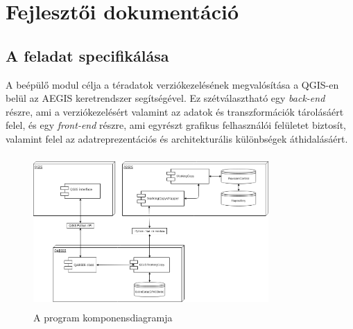 \chapter{Fejlesztői dokumentáció}
\label{ch:impl}

\section{A feladat specifikálása}
A beépülő modul célja a téradatok verziókezelésének megvalósítása a QGIS-en belül az AEGIS keretrendszer segítségével. Ez szétválasztható egy \emph{back-end} részre, ami a verziókezelésért valamint az adatok és transzformációk tárolásáért felel, és egy \emph{front-end} részre, ami egyrészt grafikus felhasználói felületet biztosít, valamint felel az adatreprezentációs és architekturális különbségek áthidalásáért.

\begin{figure}[H]
	\centering
	\includegraphics[width=0.8\textwidth,height=220px]{images/qaegis_component_diagram.png}
	\caption{A program komponensdiagramja}
	\label{fig:picture-7}
\end{figure}

